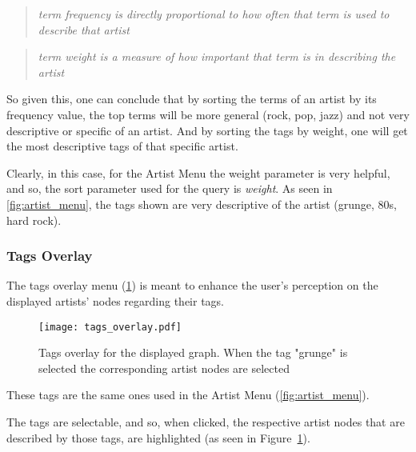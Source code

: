       \begin{quote}
      \emph{
        term frequency is directly proportional to how often that term is used to describe that artist
      }
      \end{quote}

      \begin{quote}
      \emph{
        term weight is a measure of how important that term is in describing the artist
      }
      \end{quote}

      So given this, one can conclude that by sorting the terms of an artist by its frequency value, the top terms will be more general (rock, pop, jazz) and not very descriptive or specific of an artist.
      And by sorting the tags by weight, one will get the most descriptive tags of that specific artist.

      Clearly, in this case, for the Artist Menu the weight parameter is very helpful, and so, the sort parameter used for the query is \emph{weight}.
      As seen in \ref{fig:artist_menu}, the tags shown are very descriptive of the artist (grunge, 80s, hard rock). \\


    \subsubsection{Tags Overlay} %
      \label{ssub:tags_overlay}

      The tags overlay menu (\ref{fig:tags_overlay}) is meant to enhance the user's perception on the displayed artists' nodes regarding their tags.

      \begin{figure}[tb]
        \begin{center}
          \texttt{[image: tags\_overlay.pdf]}
        \end{center}
        \caption{Tags overlay for the displayed graph. When the tag "grunge" is selected the corresponding artist nodes are selected}
        \label{fig:tags_overlay}
      \end{figure}

      These tags are the same ones used in the Artist Menu (\ref{fig:artist_menu}).

      The tags are selectable, and so, when clicked, the respective artist nodes that are described by those tags, are highlighted (as seen in Figure~\ref{fig:tags_overlay}).


